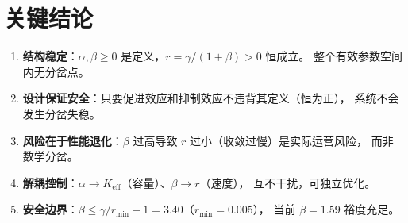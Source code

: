\documentclass[12pt,a4paper]{article}
\begin{document}
\section{关键结论}

\begin{enumerate}
  \item \textbf{结构稳定}：$\alpha, \beta \geq 0$ 是定义，$r = \gamma/(1+\beta) > 0$ 恒成立。
        整个有效参数空间内无分岔点。
  \item \textbf{设计保证安全}：只要促进效应和抑制效应不违背其定义（恒为正），
        系统不会发生分岔失稳。
  \item \textbf{风险在于性能退化}：$\beta$ 过高导致 $r$ 过小（收敛过慢）是实际运营风险，
        而非数学分岔。
  \item \textbf{解耦控制}：$\alpha \to K_{\text{eff}}$（容量）、$\beta \to r$（速度），
        互不干扰，可独立优化。
  \item \textbf{安全边界}：$\beta \leq \gamma/r_{\min} - 1 = 3.40$（$r_{\min} = 0.005$），
        当前 $\beta = 1.59$ 裕度充足。
\end{enumerate}
\end{document}
